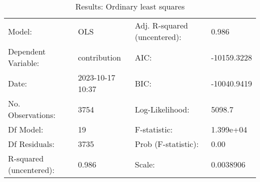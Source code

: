 \begin{table}
\caption{Results: Ordinary least squares}
\label{}
\begin{center}
\begin{tabular}{llll}
\hline
Model:                  & OLS              & Adj. R-squared (uncentered): & 0.986        \\
Dependent Variable:     & contribution     & AIC:                         & -10159.3228  \\
Date:                   & 2023-10-17 10:37 & BIC:                         & -10040.9419  \\
No. Observations:       & 3754             & Log-Likelihood:              & 5098.7       \\
Df Model:               & 19               & F-statistic:                 & 1.399e+04    \\
Df Residuals:           & 3735             & Prob (F-statistic):          & 0.00         \\
R-squared (uncentered): & 0.986            & Scale:                       & 0.0038906    \\
\hline
\end{tabular}
\end{center}


\end{table}
